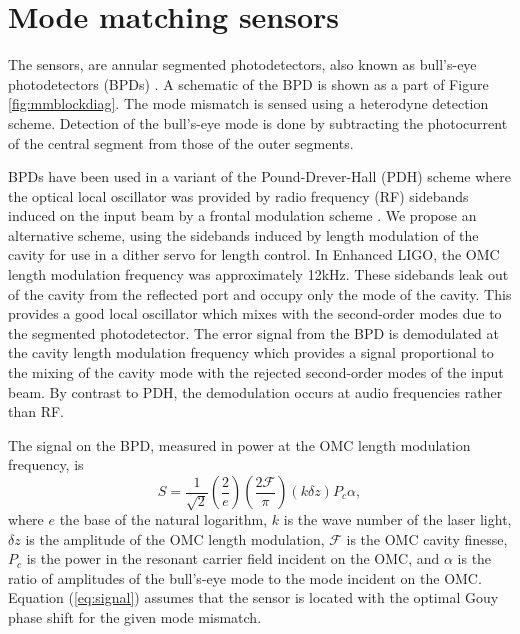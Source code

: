 \section{Mode matching sensors}
The sensors, are annular segmented photodetectors, also known as bull's-eye photodetectors (BPDs) \cite{Mueller:00}. %
A schematic of the BPD is shown as a part of Figure \ref{fig:mmblockdiag}. %
The mode mismatch is sensed using a heterodyne detection scheme. %
Detection of the bull's-eye mode is done by subtracting the photocurrent of the central segment from those of the outer segments. %


BPDs have been used in a variant of the Pound-Drever-Hall (PDH) scheme where the optical local oscillator was provided by radio frequency (RF) sidebands induced on the input beam by a frontal modulation scheme \cite{Mueller:00}. %
We propose an alternative scheme, using the sidebands induced by length modulation of the cavity for use in a dither servo for length control. %
In Enhanced LIGO, the OMC length modulation frequency was approximately 12kHz. %
These sidebands leak out of the cavity from the reflected port and occupy only the  mode of the cavity. %
This provides a good local oscillator which mixes with the second-order modes due to the segmented photodetector. %
The error signal from the BPD is demodulated at the cavity length modulation frequency which provides a signal proportional to the mixing of the  cavity mode with the rejected second-order modes of the input beam. %
By contrast to PDH, the demodulation occurs at audio frequencies rather than RF.

The signal on the BPD, measured in power at the OMC length modulation frequency, is\cite{Sigg:00,ModalModelUpdate4}
\begin{equation}
\label{eq:signal}
S = \frac{1}{\sqrt 2}\left(\frac{2}{e}\right)\left(\frac{2 \mathcal{F}}{\pi}\right)\left(k \delta z\right) P_c \alpha,
\end{equation}
where $e$ the base of the natural logarithm, $k$ is the wave number of the laser light, $\delta z$ is the amplitude of the OMC length modulation, $\mathcal{F}$ is the OMC cavity finesse, $P_c$ is the power in the resonant carrier field incident on the OMC, and $\alpha$ is the ratio of amplitudes of the bull's-eye mode to the  mode incident on the OMC. %
Equation (\ref{eq:signal}) assumes that the sensor is located with the optimal Gouy phase shift for the given mode mismatch.

